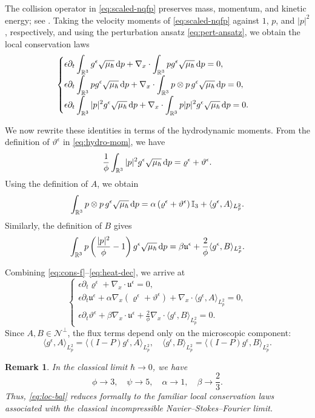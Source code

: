 \documentclass[10pt,reqno]{amsart}
\numberwithin{equation}{section}
\newtheorem{remark}{Remark}[section]
\newcommand{\lt}{\left}
\newcommand{\rt}{\right}
\newcommand{\lal}{\langle}
\newcommand{\ral}{\rangle}
\newcommand{\mR}{\mathbb{R}}
\newcommand{\vrh}{\varrho}
\newcommand{\vth}{\vartheta}
\newcommand{\mfu}{\mathfrak{u}}
\newcommand{\intr}{\int_{\mR^3}}
\newcommand{\bq}{\begin{equation}}
\newcommand{\eq}{\end{equation}}
\newcommand{\pa}{\partial}
\newcommand{\calN}{\mathcal N}
\newcommand{\rdp}{\textnormal{d}p}
\begin{document}
The collision operator in \eqref{eq:scaled-nqfp} preserves mass, momentum, and kinetic energy; see \cite[Section 2.3]{CHHpre}. Taking the velocity moments of \eqref{eq:scaled-nqfp} against $1$, $p$, and $|p|^2$, respectively, and using the perturbation ansatz \eqref{eq:pert-ansatz}, we obtain the local conservation laws
\bq\label{eq:cons-f}
\begin{cases}
\displaystyle \epsilon\pa_t\intr g^\epsilon\sqrt{\mu_\hbar}\,\rdp+\nabla_x\cdot\intr pg^\epsilon\sqrt{\mu_\hbar}\,\rdp=0,\\[6pt]
\displaystyle \epsilon\pa_t\intr pg^\epsilon\sqrt{\mu_\hbar}\,\rdp+\nabla_x\cdot\intr p\otimes p\,g^\epsilon\sqrt{\mu_\hbar}\,\rdp=0,\\[6pt]
\displaystyle \epsilon\pa_t\intr |p|^2g^\epsilon\sqrt{\mu_\hbar}\,\rdp+\nabla_x\cdot\intr p|p|^2g^\epsilon\sqrt{\mu_\hbar}\,\rdp=0.
\end{cases}
\eq

We now rewrite these identities in terms of the hydrodynamic moments. From the definition of $\vth^\epsilon$ in \eqref{eq:hydro-mom}, we have
\[
\frac{1}{\phi }\intr |p|^2g^\epsilon\sqrt{\mu_\hbar}\,\rdp=\vrh^\epsilon+\vth^\epsilon.
\]
Using the definition of $A $, we obtain
\[
\intr p\otimes p\,g^\epsilon\sqrt{\mu_\hbar}\,\rdp=\alpha\lt(\vrh^\epsilon+\vth^\epsilon\rt)\mathbb I_3+\lal g^\epsilon,A \ral_{L^2_p}.
\]
Similarly, the definition of $B $ gives
\bq\label{eq:heat-dec}
\intr p\lt(\frac{|p|^2}{\phi }-1\rt)g^\epsilon\sqrt{\mu_\hbar}\,\rdp=\beta \mfu^\epsilon+\frac{2}{\phi }\lal g^\epsilon,B \ral_{L^2_p}.
\eq

Combining \eqref{eq:cons-f}--\eqref{eq:heat-dec}, we arrive at
\bq\label{eq:loc-bal}
\begin{cases}
\displaystyle \epsilon\pa_t\vrh^\epsilon+\nabla_x\cdot\mfu^\epsilon=0,\\[6pt]
\displaystyle \epsilon\pa_t\mfu^\epsilon+\alpha\nabla_x\lt(\vrh^\epsilon+\vth^\epsilon\rt)+\nabla_x\cdot\lal g^\epsilon,A \ral_{L^2_p}=0,\\[6pt]
\displaystyle \epsilon\pa_t\vth^\epsilon+\beta \nabla_x\cdot\mfu^\epsilon+\frac{2}{\phi }\nabla_x\cdot\lal g^\epsilon,B \ral_{L^2_p}=0.
\end{cases}
\eq
Since $A ,B \in\calN^\perp$, the flux terms depend only on the microscopic component:
\bq\label{eq:flux-micro}
\lal g^\epsilon,A \ral_{L^2_p}=\lal(I-P)g^\epsilon,A \ral_{L^2_p},
\quad
\lal g^\epsilon,B \ral_{L^2_p}=\lal(I-P)g^\epsilon,B \ral_{L^2_p}.
\eq

\begin{remark}
In the classical limit $\hbar\to0$, we have
\[
\phi \to3, \quad \psi \to5, \quad \alpha\to1, \quad \beta \to\frac{2}{3}.
\]
Thus, \eqref{eq:loc-bal} reduces formally to the familiar local conservation laws associated with the classical incompressible Navier--Stokes--Fourier limit.
\end{remark}
\end{document}
